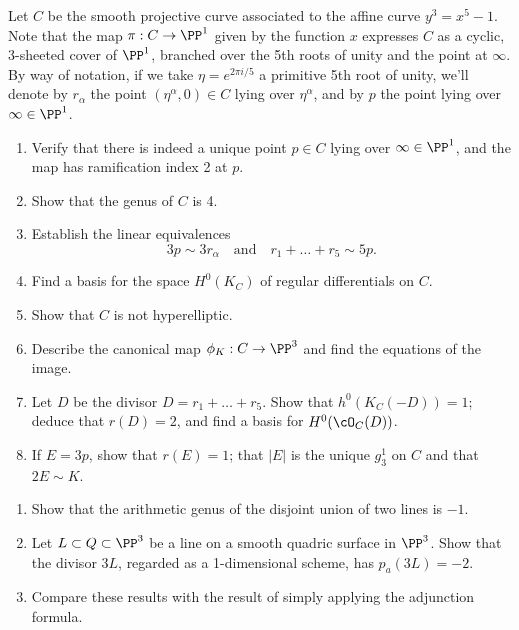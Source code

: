 \begin{exercise}
Let $C$ be the smooth projective curve associated to the affine curve $y^3 = x^5 -1$. Note that the map $\pi : C \to \PP^1$ given by the function $x$ expresses $C$ as a cyclic, 3-sheeted cover of $\PP^1$, branched over the 5th roots of unity and the point at $\infty$. By way of notation, if we take $\eta = e^{2\pi i/5}$ a primitive 5th root of unity, we'll denote by $r_\alpha$ the point $(\eta^\alpha, 0) \in C$ lying over $\eta^\alpha$, and by $p$ the point lying over $\infty \in \PP^1$.

\begin{enumerate}
\item Verify that there is indeed a unique point $p \in C$ lying over $\infty \in \PP^1$, and the map has ramification index 2 at $p$. 
\item Show that the genus of $C$ is 4.
\item Establish the linear equivalences
$$
3p \sim 3r_\alpha \quad \text{and} \quad r_1+ \dots + r_5 \sim 5p.
$$
\item Find a basis for the space $H^0(K_C)$ of regular differentials on $C$.
\item Show that $C$ is not hyperelliptic.
\item Describe the canonical map $\phi_K : C \to \PP^3$ and find the equations of the image.
\item Let $D$ be the divisor $D = r_1+\dots+r_5$. Show that $h^0(K_C(-D)) = 1$; deduce that $r(D) = 2$, and find a basis for $H^0(\cO_C(D))$.
\item If $E = 3p$, show that $r(E) = 1$; that $|E|$ is the unique $g^1_3$ on $C$ and that $2E \sim K$.
\end{enumerate}
\end{exercise}


\begin{exercise}\label{pa example}
\begin{enumerate}
 \item Show that the arithmetic genus of the disjoint union of two lines is $-1$.
\item Let $L\subset Q\subset \PP^3$ be a line on a smooth quadric surface in $\PP^3$. Show that the 
divisor $3L$, regarded as a 1-dimensional scheme, has $p_a(3L) = -2$.
\item Compare these results with the result of simply applying the adjunction formula.
\end{enumerate}
\end{exercise}

